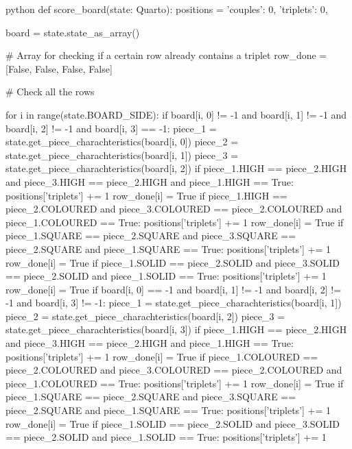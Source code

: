 \begin{mintedbox}{python}
def score_board(state: Quarto):
    positions = {
        'couples': 0,
        'triplets': 0,
    }

    board = state.state_as_array()

    # Array for checking if a certain row already contains a triplet
    row_done = [False, False, False, False]

    # Check all the rows

    for i in range(state.BOARD_SIDE):
        if board[i, 0] != -1 and board[i, 1] != -1 and board[i, 2] != -1 and board[i, 3] == -1:
            piece_1 = state.get_piece_charachteristics(board[i, 0])
            piece_2 = state.get_piece_charachteristics(board[i, 1])
            piece_3 = state.get_piece_charachteristics(board[i, 2])
            if piece_1.HIGH == piece_2.HIGH and piece_3.HIGH == piece_2.HIGH and piece_1.HIGH == True:
                positions['triplets'] += 1
                row_done[i] = True
            if piece_1.HIGH == piece_2.COLOURED and piece_3.COLOURED == piece_2.COLOURED and piece_1.COLOURED == True:
                positions['triplets'] += 1
                row_done[i] = True
            if piece_1.SQUARE == piece_2.SQUARE and piece_3.SQUARE == piece_2.SQUARE and piece_1.SQUARE == True:
                positions['triplets'] += 1
                row_done[i] = True
            if piece_1.SOLID == piece_2.SOLID and piece_3.SOLID == piece_2.SOLID and piece_1.SOLID == True:
                positions['triplets'] += 1
                row_done[i] = True
        if board[i, 0] == -1 and board[i, 1] != -1 and board[i, 2] != -1 and board[i, 3] != -1:
            piece_1 = state.get_piece_charachteristics(board[i, 1])
            piece_2 = state.get_piece_charachteristics(board[i, 2])
            piece_3 = state.get_piece_charachteristics(board[i, 3])
            if piece_1.HIGH == piece_2.HIGH and piece_3.HIGH == piece_2.HIGH and piece_1.HIGH == True:
                positions['triplets'] += 1
                row_done[i] = True
            if piece_1.COLOURED == piece_2.COLOURED and piece_3.COLOURED == piece_2.COLOURED and piece_1.COLOURED == True:
                positions['triplets'] += 1
                row_done[i] = True
            if piece_1.SQUARE == piece_2.SQUARE and piece_3.SQUARE == piece_2.SQUARE and piece_1.SQUARE == True:
                positions['triplets'] += 1
                row_done[i] = True
            if piece_1.SOLID == piece_2.SOLID and piece_3.SOLID == piece_2.SOLID and piece_1.SOLID == True:
                positions['triplets'] += 1

\end{mintedbox}
